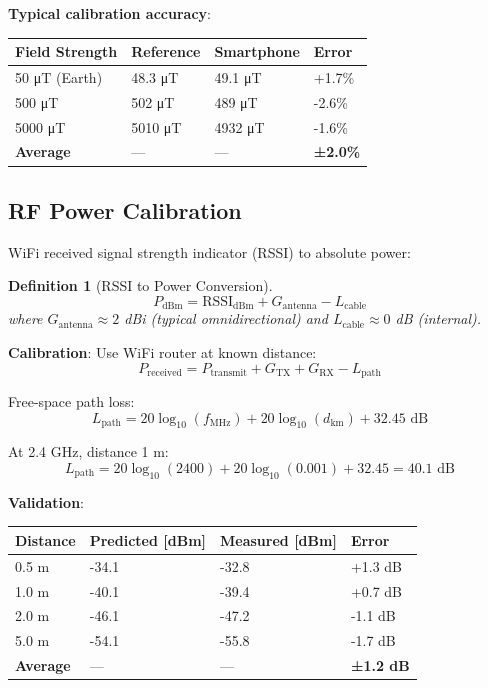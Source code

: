 \documentclass[12pt,a4paper]{article}
\newtheorem{definition}{Definition}
\begin{document}
\textbf{Typical calibration accuracy}:
\begin{center}
\begin{tabular}{|l|l|l|l|}
\hline
\textbf{Field Strength} & \textbf{Reference} & \textbf{Smartphone} & \textbf{Error} \\
\hline
50 μT (Earth) & 48.3 μT & 49.1 μT & +1.7\% \\
500 μT & 502 μT & 489 μT & -2.6\% \\
5000 μT & 5010 μT & 4932 μT & -1.6\% \\
\hline
\textbf{Average} & — & — & \textbf{±2.0\%} \\
\hline
\end{tabular}
\end{center}

\subsection{RF Power Calibration}

WiFi received signal strength indicator (RSSI) to absolute power:

\begin{definition}[RSSI to Power Conversion]
\begin{equation}
P_{\text{dBm}} = \text{RSSI}_{\text{dBm}} + G_{\text{antenna}} - L_{\text{cable}}
\end{equation}
where $G_{\text{antenna}} \approx 2$ dBi (typical omnidirectional) and $L_{\text{cable}} \approx 0$ dB (internal).
\end{definition}

\textbf{Calibration}: Use WiFi router at known distance:
\begin{equation}
P_{\text{received}} = P_{\text{transmit}} + G_{\text{TX}} + G_{\text{RX}} - L_{\text{path}}
\end{equation}

Free-space path loss:
\begin{equation}
L_{\text{path}} = 20 \log_{10}(f_{\text{MHz}}) + 20\log_{10}(d_{\text{km}}) + 32.45 \text{ dB}
\end{equation}

At 2.4 GHz, distance 1 m:
\begin{equation}
L_{\text{path}} = 20\log_{10}(2400) + 20\log_{10}(0.001) + 32.45 = 40.1 \text{ dB}
\end{equation}

\textbf{Validation}:
\begin{center}
\begin{tabular}{|l|l|l|l|}
\hline
\textbf{Distance} & \textbf{Predicted [dBm]} & \textbf{Measured [dBm]} & \textbf{Error} \\
\hline
0.5 m & -34.1 & -32.8 & +1.3 dB \\
1.0 m & -40.1 & -39.4 & +0.7 dB \\
2.0 m & -46.1 & -47.2 & -1.1 dB \\
5.0 m & -54.1 & -55.8 & -1.7 dB \\
\hline
\textbf{Average} & — & — & \textbf{±1.2 dB} \\
\hline
\end{tabular}
\end{center}
\end{document}
